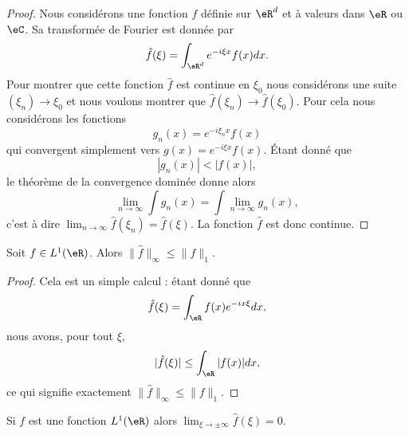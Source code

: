 \begin{proof}
    Nous considérons une fonction \( f\) définie sur \( \eR^d\) et à valeurs dans \( \eR\) ou \( \eC\). Sa transformée de Fourier est donnée par
    \begin{equation}
        \hat f(\xi)=\int_{\eR^d} e^{-i\xi x}f(x)dx.
    \end{equation}
    Pour montrer que cette fonction \( \hat f\) est continue en \( \xi_0\) nous considérons une suite \( (\xi_n)\to \xi_0\) et nous voulons montrer que \( \hat f(\xi_n)\to\hat f(\xi_0)\). Pour cela nous considérons les fonctions
\begin{equation}
    g_n(x)= e^{-i\xi_nx}f(x)
\end{equation}
qui convergent simplement vers \( g(x)= e^{-i\xi x}f(x)\). Étant donné que
\begin{equation}
    | g_n(x) |<| f(x) |,
\end{equation}
le théorème de la convergence dominée donne alors
\begin{equation}
    \lim_{n\to \infty} \int g_n(x)=\int\lim_{n\to \infty } g_n(x),
\end{equation}
c'est à dire \( \lim_{n\to \infty} \hat f(\xi_n)=\hat f(\xi)\). La fonction \( \hat f\) est donc continue.
\end{proof}

\begin{lemma}
    Soit \( f\in L^1(\eR)\). Alors \( \| \hat f \|_{\infty}\leq \| f \|_1\).
\end{lemma}

\begin{proof}
    Cela est un simple calcul : étant donné que
    \begin{equation}
        \hat f(\xi)=\int_{\eR}f(x) e^{-ix\xi}dx,
    \end{equation}
    nous avons, pour tout \( \xi\),
    \begin{equation}
        | \hat f(\xi) |\leq\int_{\eR}| f(x) |dx,
    \end{equation}
    ce qui signifie exactement \( \| \hat f \|_{\infty}\leq \| f \|_1\).
\end{proof}

\begin{lemma}     \label{LesmRLaxXkQV}
    Si \( f\) est une fonction \( L^1(\eR)\) alors \( \lim_{\xi\to\pm\infty} \hat f(\xi)=0\).
\end{lemma}

